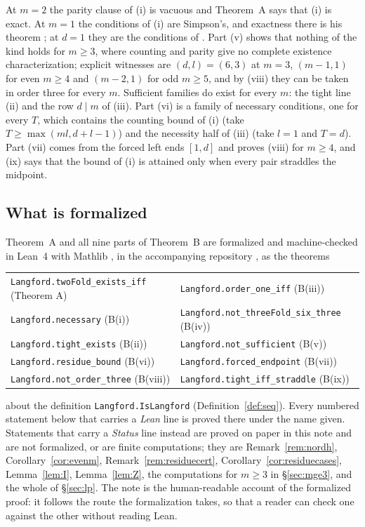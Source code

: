 \documentclass[11pt]{amsart}
\theoremstyle{plain}
\theoremstyle{definition}
\theoremstyle{remark}
\begin{document}
At $m = 2$ the parity clause of (i) is vacuous and Theorem~A says that (i) is exact. At
$m = 1$ the conditions of (i) are Simpson's, and exactness there is his theorem
\cite{Simpson}; at $d = 1$ they are the conditions of \cite{BNSS}. Part (v) shows that
nothing of the kind holds for $m \ge 3$, where counting and parity give no complete
existence characterization; explicit witnesses are $(d,l) = (6,3)$ at $m = 3$,
$(m-1,1)$ for even $m \ge 4$ and $(m-2,1)$ for odd $m \ge 5$, and by (viii) they can be
taken in order three for every $m$. Sufficient families do exist for every $m$: the
tight line (ii) and the row $d \mid m$ of (iii). Part (vi) is a family of necessary
conditions, one for every $T$, which contains the counting bound of (i) (take
$T \ge \max(ml, d+l-1)$) and the necessity half of (iii) (take $l = 1$ and $T = d$). Part
(vii) comes from the forced left ends $[1,d]$ and proves (viii) for $m \ge 4$, and (ix)
says that the bound of (i) is attained only when every pair straddles the midpoint.

\subsection*{What is formalized}
Theorem~A and all nine parts of Theorem~B are formalized and machine-checked in Lean~4
with Mathlib \cite{Lean4,Mathlib}, in the accompanying repository \cite{l2lean}, as the
theorems
\begin{center}\small
\begin{tabular}{@{}ll@{}}
\texttt{Langford.twoFold\_exists\_iff} (Theorem A) & \texttt{Langford.order\_one\_iff} (B(iii))\\
\texttt{Langford.necessary} (B(i)) & \texttt{Langford.not\_threeFold\_six\_three} (B(iv))\\
\texttt{Langford.tight\_exists} (B(ii)) & \texttt{Langford.not\_sufficient} (B(v))\\
\texttt{Langford.residue\_bound} (B(vi)) & \texttt{Langford.forced\_endpoint} (B(vii))\\
\texttt{Langford.not\_order\_three} (B(viii)) & \texttt{Langford.tight\_iff\_straddle} (B(ix))
\end{tabular}
\end{center}
about the definition \texttt{Langford.IsLangford} (Definition~\ref{def:seq}). Every numbered
statement below that carries a \emph{Lean} line is proved there under the name given.
Statements that carry a \emph{Status} line instead are proved on paper in this note and
are not formalized, or are finite computations; they are Remark~\ref{rem:nordh},
Corollary~\ref{cor:evenm}, Remark~\ref{rem:residuecert},
Corollary~\ref{cor:residuecases}, Lemma~\ref{lem:I}, Lemma~\ref{lem:Z}, the computations
for $m \ge 3$ in \S\ref{sec:mge3}, and the whole of \S\ref{sec:lp}. The note is the human-readable account
of the formalized proof: it follows the route the formalization takes, so that a reader
can check one against the other without reading Lean.
\end{document}

